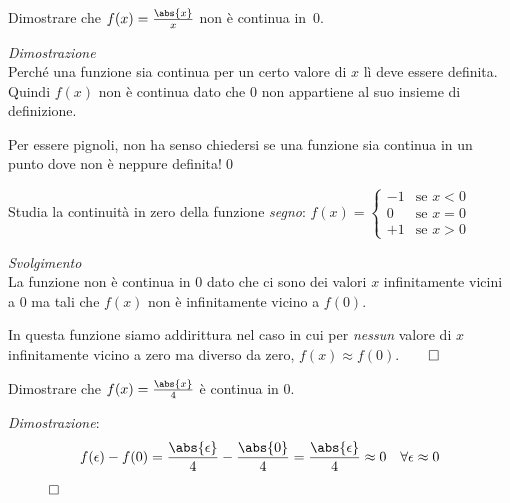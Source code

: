\begin{esempio}
Dimostrare che \(f(x)=\frac{\abs{x}}{x}\) non è continua in~0.

{
\emph{Dimostrazione}\\
Perché una funzione sia continua per un certo valore di \(x\) 
lì deve essere definita. 
Quindi \(f(x)\) non è continua dato che \(0\) non appartiene al suo insieme 
di definizione.

Per essere pignoli, non ha senso chiedersi se una funzione sia 
continua in un punto dove non è neppure definita!\hfill \qed
}{
\scalebox{.9}{\contsecondo}
}
\end{esempio}



\begin{esempio}
Studia la continuità in zero della funzione \emph{segno}:
\(f(x)=\begin{cases} 
    -1 & \text{se } x < 0 \\ 
     0 & \text{se } x = 0 \\ 
    +1 & \text{se } x > 0
  \end{cases}
\)

\vspace{-.5em}
{
\scalebox{.9}{\fsegno}
}{
\emph{Svolgimento}\\
La funzione non è continua in \(0\) dato che ci sono dei valori 
\(x\) infinitamente vicini a \(0\) ma tali che \(f(x)\) non è infinitamente 
vicino a \(f(0)\). 

In questa funzione siamo addirittura nel caso in cui per \emph{nessun} 
valore di \(x\) infinitamente vicino a zero ma diverso da zero, 
\(f(x) \approx f(0)\).\hfill \(\qed\)
}
\end{esempio}

{
\begin{esempio}
 Dimostrare che \(f(x)=\frac{\abs{x}}{4}\) è continua in \(0\).

\emph{Dimostrazione}:
\[f(\epsilon) - f(0) = \frac{\abs{\epsilon}}{4} - \frac{\abs{0}}{4} = 
 \frac{\abs{\epsilon}}{4} \approx 0 \quad \forall \epsilon \approx 0\]
~ \hfill \(\qed\)
\end{esempio}
}{
\scalebox{1}{\contterzo}
}

